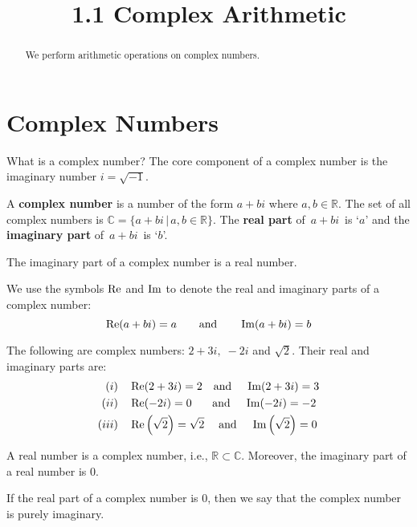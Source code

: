 \documentclass[handout]{ximera}
\title{1.1 Complex Arithmetic}
\begin{document}
\begin{abstract}
We perform arithmetic operations on complex numbers.
\end{abstract}

\maketitle

\section{Complex Numbers}

What is a complex number?  The core component of a complex number is the imaginary number $i = \sqrt{-1}$.

\begin{definition}
A {\bf complex number} is a number of the form $a+bi$ where $a,b \in \mathbb{R}$. 
The set of all complex numbers is $\mathbb{C}= \{a+bi \,|\, a,b \in \mathbb{R}\}$. 
The {\bf real part} of $\,a+bi\,$ is `$a$' and the {\bf imaginary part} of $\,a+bi\,$ is `$b$'.
\end{definition}

\begin{remark}
The imaginary part of a complex number is a real number.
\end{remark}

We use the symbols $\operatorname{Re}$ and $\operatorname{Im}$ to denote the real and imaginary parts of a complex number:
\[
\operatorname{Re}(a+bi) = a \qquad \mbox{and} \qquad \operatorname{Im}(a+bi) = b
\]


\begin{example}[Example 1] 
The following are complex numbers: $2+3i, \; -2i$ and $\sqrt 2$.
Their real and imaginary parts are:
\begin{align*}
(i)& \quad \operatorname{Re}(2+3i) = 2 \quad \mbox{and} \quad \;\operatorname{Im}(2+3i) = 3 \\
(ii)& \quad \operatorname{Re}(-2i) = 0 \quad \;\;\; \mbox{and} \quad \;\operatorname{Im}(-2i) = -2 \\
(iii)& \quad \operatorname{Re}\left(\sqrt 2\right) = \sqrt 2 \quad \;\mbox{and} \quad \;\operatorname{Im}\left(\sqrt 2\right) = 0 
\end{align*}

\end{example}


\begin{remark}
A real number is a complex number, i.e., $\mathbb{R} \subset \mathbb{C}$. 
Moreover, the imaginary part of a real number is $0$.
\end{remark}
\begin{remark}
If the real part of a complex number is $0$, then we say that the complex number is purely imaginary. 
\end{remark}
\end{document}
